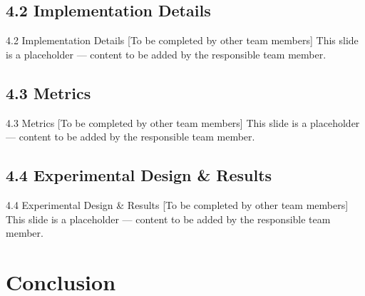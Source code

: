 \documentclass[aspectratio=169,10pt]{beamer}
\newcommand{\smallnote}[1]{{\scriptsize\textcolor{Muted}{#1}}}
\newcommand{\placeholderslide}[1]{%
  \begin{frame}{#1}
    \centering
    \vspace{3cm}
    {\Large\textcolor{Muted}{[To be completed by other team members]}}
    \vspace{0.5cm}
    \smallnote{This slide is a placeholder — content to be added by the responsible team member.}
  \end{frame}
}
\begin{document}
\subsection{4.2 Implementation Details}
\placeholderslide{4.2 Implementation Details}
\subsection{4.3 Metrics}
\placeholderslide{4.3 Metrics}
\subsection{4.4 Experimental Design \& Results}
\placeholderslide{4.4 Experimental Design \& Results}

\section{Conclusion}
\end{document}
